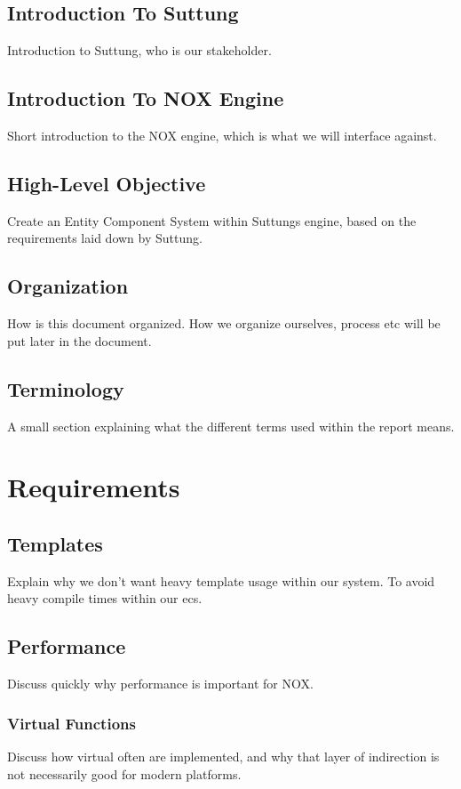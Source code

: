 \section{Introduction To Suttung}
Introduction to Suttung, who is our stakeholder.

\section{Introduction To NOX Engine}
Short introduction to the NOX engine, which is what we will interface against.

\section{High-Level Objective}
Create an Entity Component System within Suttungs engine,
based on the requirements laid down by Suttung.

\section{Organization}
How is this document organized.
How we organize ourselves, process etc will be put later in the document.

\section{Terminology}
A small section explaining what the different terms used within the report means.

\chapter{Requirements}
\label{chap:requirements}

\section{Templates}
Explain why we don't want heavy template usage within our system.
To avoid heavy compile times within our ecs.

\section{Performance}
Discuss quickly why performance is important for NOX.

\subsection{Virtual Functions}
Discuss how virtual often are implemented, and why that layer of indirection is not necessarily good for modern platforms.

